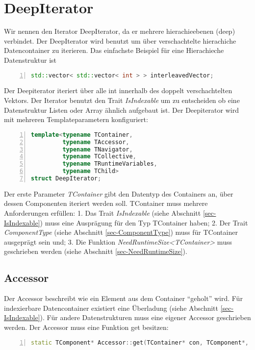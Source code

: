 \section{DeepIterator}
Wir nennen den Iterator DeepIterator, da er mehrere hierachieebenen (deep) verbindet. Der DeepIterator wird benutzt um über verschachtelte hierachiche Datencontainer zu iterieren. Das einfachste Beispiel für eine Hierachieche Datenstruktur ist
\begin{lstlisting}[language=c++, numbers=left] 
std::vector< std::vector< int > > interleavedVector;
\end{lstlisting}
Der Deepiterator iteriert über alle int innerhalb des doppelt verschachtelten Vektors. Der Iterator benutzt den Trait \textit{IsIndexable} um zu entscheiden ob eine Datenstruktur Listen oder Array ähnlich aufgebaut ist. Der Deepiterator wird mit mehreren Templateparametern konfiguriert:
\begin{lstlisting}[language=c++, numbers=left]
template<typename TContainer, 
         typename TAccessor, 
         typename TNavigator, 
         typename TCollective, 
         typename TRuntimeVariables,
         typename TChild>
struct DeepIterator;
\end{lstlisting}

Der erste Parameter \textit{TContainer} gibt den Datentyp des Containers an, über dessen Componenten iteriert werden soll. TContainer muss mehrere Anforderungen erfüllen: 1. Das Trait \textit{IsIndexable} (siehe Abschnitt \ref{sec-IsIndexable}) muss eine Ausprägung für den Typ TContainer haben; 2. Der Trait \textit{ComponentType} (siehe Abschnitt \ref{sec-ComponentType}) muss für TContainer ausgeprägt sein und; 3. Die Funktion \textit{NeedRuntimeSize<TContainer>} muss geschrieben werden (siehe Abschnitt \ref{sec-NeedRuntimeSize}).


\subsection{Accessor}
Der Accessor beschreibt wie ein Element aus dem Container ``geholt'' wird. Für indexierbare Datencontainer existiert eine Überladung (siehe Abschnitt \ref{sec-IsIndexable}). Für andere Datenstrukturen muss eine eigener Accessor geschrieben werden. Der Accessor muss eine Funktion get besitzen:
\begin{lstlisting}[language=c++, numbers=left]
 static TComponent* Accessor::get(TContainer* con, TComponent*, TIndex&, const RuntimeVariables&)
\end{lstlisting}


